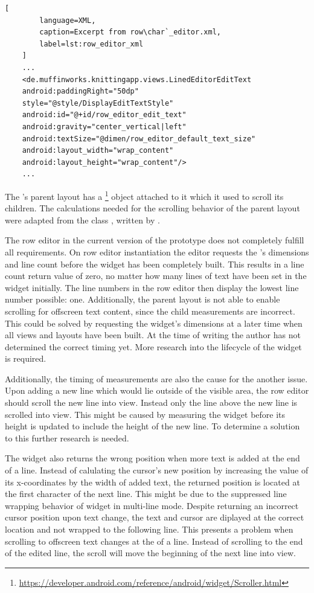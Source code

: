 \begin{lstlisting}[
		language=XML, 
		caption=Excerpt from row\char`_editor.xml, 
		label=lst:row_editor_xml
	]
	...
    <de.muffinworks.knittingapp.views.LinedEditorEditText
    android:paddingRight="50dp"
    style="@style/DisplayEditTextStyle"
    android:id="@+id/row_editor_edit_text"
    android:gravity="center_vertical|left"
    android:textSize="@dimen/row_editor_default_text_size"
    android:layout_width="wrap_content"
    android:layout_height="wrap_content"/>
	...
\end{lstlisting}

The 's parent layout has a \footnote{\url{https://developer.android.com/reference/android/widget/Scroller.html}} object attached to it which it used to scroll its children. The calculations needed for the scrolling behavior of the parent layout were adapted from the class , written by \cite{clark2010}. 

The row editor in the current version of the prototype does not completely fulfill all requirements. On row editor instantiation the editor requests the 's dimensions and line count before the widget has been completely built. This results in a line count return value of zero, no matter how many lines of text have been set in the widget initially. The line numbers in the row editor then display the lowest line number possible: one. Additionally, the parent layout is not able to enable scrolling for offscreen text content, since the child measurements are incorrect. This could be solved by requesting the  widget's dimensions at a later time when all views and layouts have been built. At the time of writing the author has not determined the correct timing yet. More research into the lifecycle of the widget is required.

Additionally, the timing of measurements are also the cause for the another issue. Upon adding a new line which would lie outside of the visible area, the row editor should scroll the new line into view. Instead only the line above the new line is scrolled into view. This might be caused by measuring the  widget before its height is updated to include the height of the new line. To determine a solution to this further research is needed.

The  widget also returns the wrong position when more text is added at the end of a line. Instead of calulating the cursor's new position by increasing the value of its x-coordinates by the width of added text, the returned position is located at the first character of the next line. This might be due to the suppressed line wrapping behavior of  widget in multi-line mode. Despite returning an incorrect cursor position upon text change, the text and cursor are diplayed at the correct location and not wrapped to the following line. This presents a problem when scrolling to offscreen text changes at the of a line. Instead of scrolling to the end of the edited line, the scroll will move the beginning of the next line into view.

